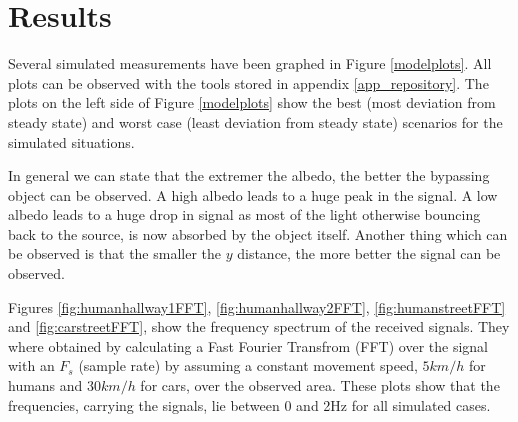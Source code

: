 \section{Results}
Several simulated measurements have been graphed in Figure \ref{modelplots}.  All plots can be observed with the tools stored in appendix \ref{app_repository}. The plots on the left side of Figure \ref{modelplots} show the best (most deviation from steady state) and worst case (least deviation from steady state) scenarios for the simulated situations. 

In general we can state that the extremer the albedo, the better the bypassing object can be observed. A high albedo leads to a huge peak in the signal. A low albedo leads to a huge drop in signal as most of the light otherwise bouncing back to the source, is now absorbed by the object itself. Another thing which can be observed is that the smaller the $y$ distance, the more better the signal can be observed.

Figures \ref{fig:humanhallway1FFT}, \ref{fig:humanhallway2FFT}, \ref{fig:humanstreetFFT} and \ref{fig:carstreetFFT}, show the frequency spectrum of the received signals. They where obtained by calculating a Fast Fourier Transfrom (FFT) over the signal with an $F_s$ (sample rate) by assuming a constant movement speed, $5km/h$ for humans and $30km/h$ for cars, over the observed area. These plots show that the frequencies, carrying the signals, lie between 0 and 2Hz for all simulated cases.

